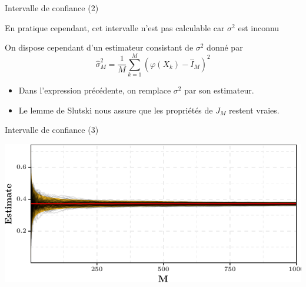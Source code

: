 \documentclass[ignorenonframetext,]{beamer}
\providecommand{\tightlist}{%
  \setlength{\itemsep}{0pt}\setlength{\parskip}{0pt}}
\begin{document}
\begin{frame}{Intervalle de confiance (2)}
\protect\hypertarget{intervalle-de-confiance-2}{}

En pratique cependant, cet intervalle n'est pas calculable car
\(\sigma^2\) est inconnu

On dispose cependant d'un estimateur consistant de \(\sigma^2\) donné
par
\[\hat{\sigma}^2_M = \frac{1}{M}\sum_{k = 1}^M \left(\varphi(X_k) - \hat{I}_M\right)^2\]

\begin{itemize}
\tightlist
\item
  Dans l'expression précédente, on remplace \(\sigma^2\) par son
  estimateur.
\item
  Le lemme de Slutski nous assure que les propriétés de \(J_M\) restent
  vraies.
\end{itemize}

\end{frame}

\begin{frame}{Intervalle de confiance (3)}
\protect\hypertarget{intervalle-de-confiance-3}{}

\includegraphics{diapos_monte_carlo_files/figure-beamer/plot_IC-1.pdf}

\end{frame}
\end{document}
